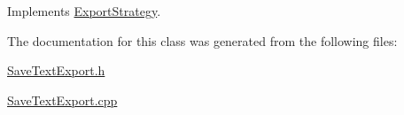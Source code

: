 Implements \hyperlink{class_export_strategy_a8f24eb340762e0c1b1faaefb32087468}{Export\-Strategy}.



The documentation for this class was generated from the following files\-:\begin{DoxyCompactItemize}
\item 
\hyperlink{_save_text_export_8h}{Save\-Text\-Export.\-h}\item 
\hyperlink{_save_text_export_8cpp}{Save\-Text\-Export.\-cpp}\end{DoxyCompactItemize}
